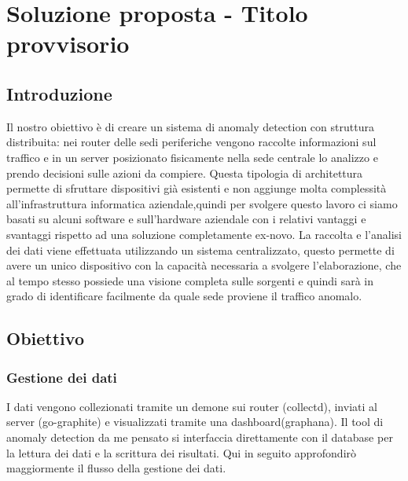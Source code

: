 \chapter{Soluzione proposta - Titolo provvisorio}

\section{Introduzione}
Il nostro obiettivo è di creare un sistema di anomaly detection con struttura distribuita: nei router delle sedi periferiche vengono raccolte informazioni sul traffico e in un server posizionato fisicamente nella sede centrale lo analizzo e prendo decisioni sulle azioni da compiere. Questa tipologia di architettura permette di sfruttare dispositivi già esistenti e non aggiunge molta complessità all'infrastruttura informatica aziendale,quindi per svolgere questo lavoro ci siamo basati su alcuni software e sull'hardware aziendale con i relativi vantaggi e svantaggi rispetto ad una soluzione completamente ex-novo.
La raccolta e l'analisi dei dati viene effettuata utilizzando un sistema centralizzato, questo permette di avere un unico dispositivo con la capacità necessaria a svolgere l'elaborazione, che al tempo stesso possiede una visione completa sulle sorgenti e quindi sarà in grado di identificare facilmente da quale sede proviene il traffico anomalo.

\section{Obiettivo}

\subsection{Gestione dei dati}

I dati vengono collezionati tramite un demone sui router (collectd), inviati al server (go-graphite) e visualizzati tramite una dashboard(graphana). Il tool di anomaly detection da me pensato si interfaccia direttamente con il database per la lettura dei dati e la scrittura dei risultati.
Qui in seguito approfondirò maggiormente il flusso della gestione dei dati.

